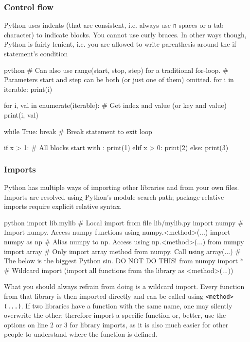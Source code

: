 \subsubsection{Control flow}
Python uses indents (that are consistent, i.e. always use \texttt{n} spaces or a tab character) to indicate blocks.
You cannot use curly braces. In other ways though, Python is fairly lenient, i.e. you are allowed to write parenthesis around the if statement's condition

\begin{code}{python}
    # Can also use range(start, stop, step) for a traditional for-loop. 
    # Parameters start and step can be both (or just one of them) omitted.
    for i in iterable: 
        print(i)

    for i, val in enumerate(iterable): # Get index and value (or key and value)
        print(i, val)

    while True:
        break # Break statement to exit loop

    if x > 1: # All blocks start with :
        print(1)
    elif x > 0:
        print(2)
    else:
        print(3)
\end{code}

\subsubsection{Imports}
Python has multiple ways of importing other libraries and from your own files.
Imports are resolved using Python's module search path; package-relative imports require explicit relative syntax.
\begin{code}{python}
    import lib.mylib # Local import from file lib/mylib.py
    import numpy # Import numpy. Access numpy functions using numpy.<method>(...)
    import numpy as np # Alias numpy to np. Access using np.<method>(...)
    from numpy import array # Only import array method from numpy. Call using array(...)
    # The below is the biggest Python sin. DO NOT DO THIS!
    from numpy import * # Wildcard import (import all functions from the library as <method>(...))
\end{code}
What you should always refrain from doing is a wildcard import. Every function from that library is then imported directly and can be called using \texttt{<method>(...)}.
If two libraries have a function with the same name, one may silently overwrite the other; therefore import a specific function or, better,
use the options on line 2 or 3 for library imports, as it is also much easier for other people to understand where the function is defined.
